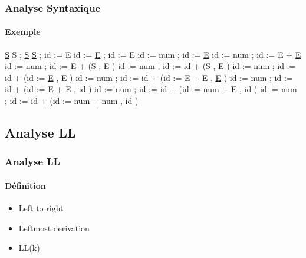 \documentclass{beamer}
\begin{document}
\begin{frame}\frametitle{Analyse Syntaxique}\framesubtitle{Exemple}

	\newline\newline
	\underline{S}\newline
	S ; \underline{S}\newline
	\underline{S} ; id := E\newline
	id := \underline{E} ; id := E\newline
	id := num ; id := \underline{E}\newline
	id := num ; id := E + \underline{E}\newline
	id := num ; id := \underline{E} + (S , E )\newline
	id := num ; id := id + (\underline{S} , E )\newline
	id := num ; id := id + (id := \underline{E} , E )\newline
	id := num ; id := id + (id := E + E , \underline{E} )\newline
	id := num ; id := id + (id := \underline{E} + E , id )\newline
	id := num ; id := id + (id := num + \underline{E} , id )\newline
	id := num ; id := id + (id := num + num , id )\newline

\end{frame}

\subsection{Analyse LL}

\begin{frame}\frametitle{Analyse LL}\framesubtitle{Définition}

	\begin{itemize}
				\item Left to right\newline
				\item Leftmost derivation\newline
				\item LL(k)\newline
	\end{itemize}

\end{frame}
\end{document}
